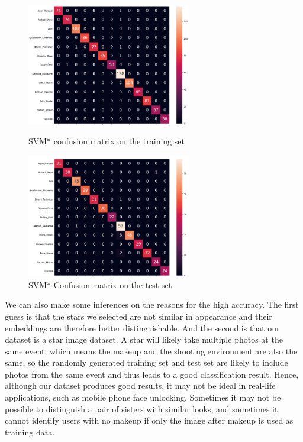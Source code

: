 \begin{figure}[H]
    \begin{minipage}[t]{0.49\textwidth}
        \centering\includegraphics[width=7.2cm]{./figures/svm_star_confusion_train.png}
        \caption{SVM* confusion matrix on the training set}
        \label{pic:confusion3}
    \end{minipage}
    \qquad
    \begin{minipage}[t]{0.49\textwidth}
        \centering\includegraphics[width=7.2cm]{./figures/svm_star_confusion_test.png}
        \caption{SVM* Confusion matrix on the test set}
        \label{pic:confusion4}
    \end{minipage}
\end{figure}

We can also make some inferences on the reasons for the high accuracy. The first guess is that the stars we selected are not similar in appearance and their embeddings are therefore better distinguishable. And the second is that our dataset is a star image dataset. A star will likely take multiple photos at the same event, which means the makeup and the shooting environment are also the same, so the randomly generated training set and test set are likely to include photos from the same event and thus leads to a good classification result. Hence, although our dataset produces good results, it may not be ideal in real-life applications, such as mobile phone face unlocking. Sometimes it may not be possible to distinguish a pair of sisters with similar looks, and sometimes it cannot identify users with no makeup if only the image after makeup is used as training data.



